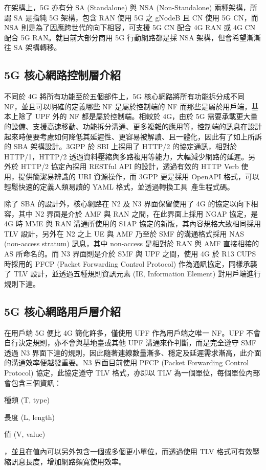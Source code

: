 在架構上，5G 亦有分 SA (Standalone) 與 NSA (Non-Standalone) 兩種架構，所謂 SA 是指純 5G 架構，包含 RAN 使用 5G 之 gNodeB 且 CN 使用 5G CN，而 NSA 則是為了因應跨世代的向下相容，可支援 5G CN 配合 4G RAN 或 4G CN 配合 5G RAN。就目前大部分商用 5G 行動網路都是採 NSA 架構，但會希望漸漸往 SA 架構轉移。


\subsection{5G 核心網路控制層介紹}
\label{subsec:5g_cp_intro}

不同於 4G 將所有功能至於五個部件上，5G 核心網路將所有功能拆分成不同 NF，並且可以明確的定義哪些 NF 是屬於控制端的 NF 而那些是屬於用戶端，基本上除了 UPF 外的 NF 都是屬於控制端。相較於 4G，由於 5G 需要承載更大量的設備、支援高速移動、功能拆分溝通、更多複雜的應用等，控制端的訊息在設計起來時便要考慮如何降低其延遲性、更容易被解讀、且一體化，因此有了如上所訴的 SBA 架構設計。3GPP 於 SBI 上採用了 HTTP/2 的協定通訊，相對於 HTTP/1，HTTP/2 透過資料壓縮與多路複用等能力，大幅減少網路的延遲。另外於 HTTP/2 協定內採用 RESTful API 的設計，透過有效的 HTTP Verb 使用，提供簡潔易辨識的 URI 資源操作，而 3GPP 更是採用 OpenAPI 格式，可以輕鬆快速的定義人類易讀的 YAML 格式，並透過轉換工具~\cite{openapi.generator}產生程式碼。

除了 SBA 的設計外，核心網路在 N2 及 N3 界面保留使用了 4G 的協定以向下相容，其中 N2 界面是介於 AMF 與 RAN 之間，在此界面上採用 NGAP 協定，是 4G 時 MME 與 RAN 溝通所使用的 S1AP 協定的新版，其內容規格大致相同採用 TLV 設計，另外在 N2 之上 UE 與 AMF 乃至於 SMF 的溝通格式採用 NAS (non-access stratum) 訊息，其中 non-access 是相對於 RAN 與 AMF 直接相接的 AS 所命名的。而 N3 界面則是介於 SMF 與 UPF 之間，使用 4G 於 R13 CUPS 時採用的 PFCP (Packet Forwarding Control Protocol) 作為通訊協定，同樣承襲了 TLV 設計，並透過五種規則資訊元素 (IE, Information Element) 對用戶端進行規則下達。

\subsection{5G 核心網路用戶層介紹}
\label{subsec:5g_up_intro}

在用戶端 5G 便比 4G 簡化許多，僅使用 UPF 作為用戶端之唯一 NF。UPF 不會自行決定規則，亦不會與基地臺或其他 UPF 溝通來作判斷，而是完全遵守 SMF 透過 N3 界面下達的規則，因此隨著連線數量漸多、穩定及延遲需求漸高，此介面的溝通效率便越發重要。N3 界面目前使用 PFCP (Packet Forwarding Control Protocol) 協定，此協定遵守 TLV 格式，亦即以 TLV 為一個單位，每個單位內部會包含三個資訊：
\begin{enumerate*}
\item 種類 (T, type)
\item 長度 (L, length)
\item 值 (V, value)
\end{enumerate*}
，並且在值內可以另外包含一個或多個更小單位，而透過使用 TLV 格式可有效壓縮訊息長度，增加網路頻寬使用效率。

